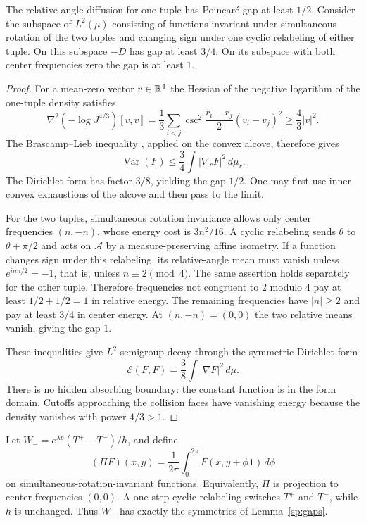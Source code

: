 \begin{lemma}\label{sp:gaps}
The relative-angle diffusion for one tuple has Poincar\'e gap at least
$1/2$.  Consider the subspace of $L^2(\mu)$ consisting of functions
invariant under simultaneous rotation of the two tuples and changing
sign under one cyclic relabeling of either tuple.  On this subspace
$-D$ has gap at least $3/4$.  On its subspace with both center
frequencies zero the gap is at least $1$.
\end{lemma}

\begin{proof}
For a mean-zero vector $v\in\mathbb R^4$ the Hessian of the negative
logarithm of the one-tuple density satisfies
\[
 \nabla^2(-\log J^{4/3})[v,v]
 =\frac13\sum_{i<j}\csc^2\frac{r_i-r_j}{2}(v_i-v_j)^2
 \ge\frac43|v|^2.
\]
The Brascamp--Lieb inequality \cite{BL,KM}, applied on the convex alcove,
therefore gives
\[
 \operatorname{Var}(F)\le\frac34\int|\nabla_rF|^2\,d\mu_r.
\]
The Dirichlet form has factor $3/8$, yielding the gap $1/2$.
One may first use inner convex exhaustions of the alcove and then
pass to the limit.

For the two tuples, simultaneous rotation invariance allows only
center frequencies $(n,-n)$, whose energy cost is $3n^2/16$.
A cyclic relabeling sends $\theta$ to $\theta+\pi/2$ and acts on
$\mathcal A$ by a measure-preserving affine isometry.  If a function
changes sign under this relabeling, its relative-angle mean must
vanish unless $e^{in\pi/2}=-1$, that is, unless $n\equiv2\pmod4$.
The same assertion holds separately for the other tuple.  Therefore
frequencies not congruent to $2$ modulo $4$ pay at least $1/2+1/2=1$
in relative energy.  The remaining frequencies have $|n|\ge2$ and
pay at least $3/4$ in center energy.  At $(n,-n)=(0,0)$ the two
relative means vanish, giving the gap $1$.

These inequalities give $L^2$ semigroup decay through the symmetric
Dirichlet form
\[
 \mathcal E(F,F)=\frac38\int|\nabla F|^2\,d\mu.
\]
There is no hidden absorbing boundary: the constant function is in
the form domain.  Cutoffs approaching the collision faces have
vanishing energy because the density vanishes with power $4/3>1$.
\end{proof}

Let $W_-=e^{\lambda p}(T^+-T^-)/h$, and define
\[
 (\Pi F)(x,y)=\frac1{2\pi}\int_0^{2\pi}
                           F(x,y+\phi\mathbf1)\,d\phi
\]
on simultaneous-rotation-invariant functions.  Equivalently, $\Pi$
is projection to center frequencies $(0,0)$.  A one-step cyclic
relabeling switches $T^+$ and $T^-$, while $h$ is unchanged.
Thus $W_-$ has exactly the symmetries of Lemma~\ref{sp:gaps}.

